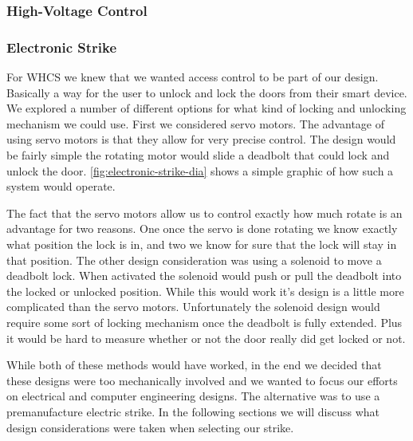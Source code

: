\subsubsection{High-Voltage Control}

\subsubsection{Electronic Strike}
\label{sec:electronic-strike}

For WHCS we knew that we wanted access control to be part of our design.
Basically a way for the user to unlock and lock the doors from their smart
device. We explored a number of different options for what kind of locking and
unlocking mechanism we could use. First we considered servo motors. The
advantage of using servo motors is that they allow for very precise control.
The design would be fairly simple the rotating motor would slide a deadbolt
that could lock and unlock the door. \autoref{fig:electronic-strike-dia} shows a simple
graphic of how such a system would operate.

 
The fact that the servo motors allow us to control exactly how much rotate is
an advantage for two reasons. One once the servo is done rotating we know
exactly what position the lock is in, and two we know for sure that the lock
will stay in that position. The other design consideration was using a solenoid
to move a deadbolt lock. When activated the solenoid would push or pull the
deadbolt into the locked or unlocked position. While this would work it{}'s
design is a little more complicated than the servo motors. Unfortunately the
solenoid design would require some sort of locking mechanism once the deadbolt
is fully extended. Plus it would be hard to measure whether or not the door
really did get locked or not.

While both of these methods would have worked, in the end we decided that these
designs were too mechanically involved and we wanted to focus our efforts on
electrical and computer engineering designs. The alternative was to use a
premanufacture electric strike. In the following sections we will discuss what
design considerations were taken when selecting our strike.

